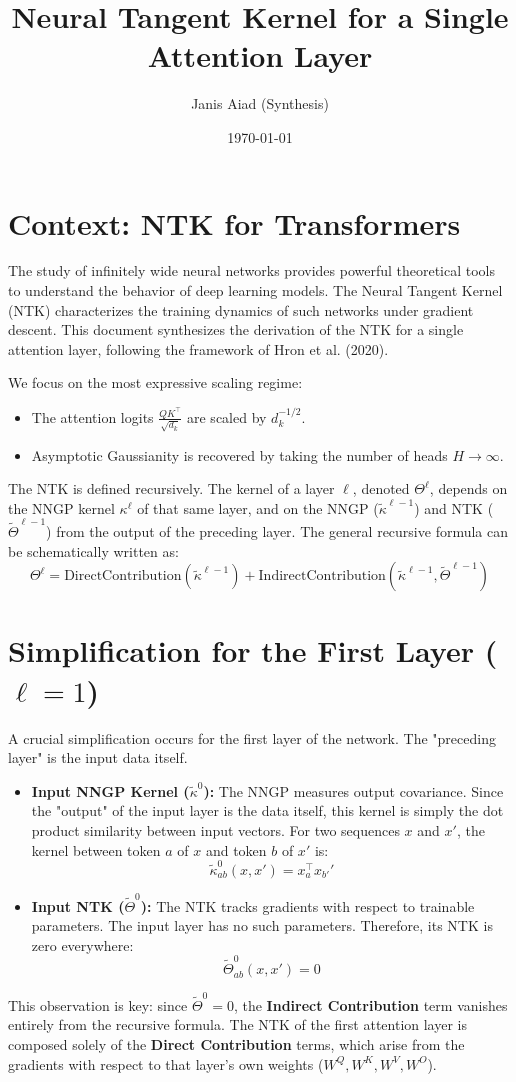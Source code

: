 \documentclass[10pt, a4paper]{article}
\title{Neural Tangent Kernel for a Single Attention Layer}
\author{Janis Aiad (Synthesis)}
\date{\today}
\begin{document}
\maketitle

\section{Context: NTK for Transformers}

The study of infinitely wide neural networks provides powerful theoretical tools to understand the behavior of deep learning models. The Neural Tangent Kernel (NTK) characterizes the training dynamics of such networks under gradient descent. This document synthesizes the derivation of the NTK for a single attention layer, following the framework of Hron et al. (2020).

We focus on the most expressive scaling regime:
\begin{itemize}
    \item The attention logits $\frac{QK^\top}{\sqrt{d_k}}$ are scaled by $d_k^{-1/2}$.
    \item Asymptotic Gaussianity is recovered by taking the number of heads $H \to \infty$.
\end{itemize}
The NTK is defined recursively. The kernel of a layer $\ell$, denoted $\Theta^\ell$, depends on the NNGP kernel $\kappa^\ell$ of that same layer, and on the NNGP ($\tilde\kappa^{\ell-1}$) and NTK ($\tilde\Theta^{\ell-1}$) from the output of the preceding layer. The general recursive formula can be schematically written as:
\[
\Theta^\ell = \text{DirectContribution}(\tilde\kappa^{\ell-1}) + \text{IndirectContribution}(\tilde\kappa^{\ell-1}, \tilde\Theta^{\ell-1})
\]

\section{Simplification for the First Layer ($\ell=1$)}

A crucial simplification occurs for the first layer of the network. The "preceding layer" is the input data itself.
\begin{itemize}
    \item \textbf{Input NNGP Kernel ($\tilde\kappa^0$):} The NNGP measures output covariance. Since the "output" of the input layer is the data itself, this kernel is simply the dot product similarity between input vectors. For two sequences $x$ and $x'$, the kernel between token $a$ of $x$ and token $b$ of $x'$ is:
    \[ \tilde\kappa^0_{ab}(x, x') = x_a^\top x_{b'}' \]
    \item \textbf{Input NTK ($\tilde\Theta^0$):} The NTK tracks gradients with respect to trainable parameters. The input layer has no such parameters. Therefore, its NTK is zero everywhere:
    \[ \tilde\Theta^0_{ab}(x, x') = 0 \]
\end{itemize}
This observation is key: since $\tilde\Theta^0 = 0$, the \textbf{Indirect Contribution} term vanishes entirely from the recursive formula. The NTK of the first attention layer is composed solely of the \textbf{Direct Contribution} terms, which arise from the gradients with respect to that layer's own weights ($W^Q, W^K, W^V, W^O$).
\end{document}
